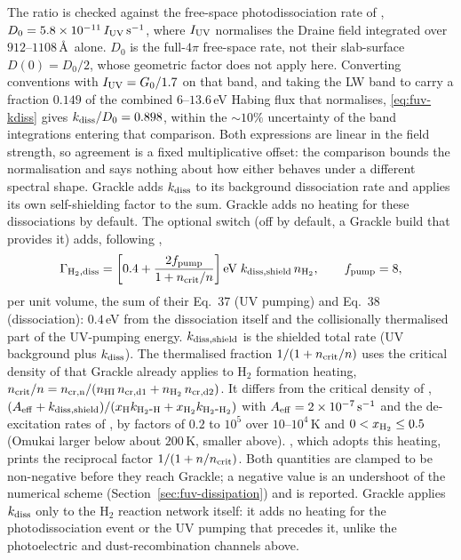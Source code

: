 The ratio is checked against the free-space photodissociation rate of
\citet[their Eq.~5]{Sternberg2014},
$D_0 = 5.8\times10^{-11}\,I_{\rm UV}\,{\rm s^{-1}}$, where $I_{\rm UV}$
normalises the Draine field integrated over $912$--$1108$\,\AA\ alone.
$D_0$ is the full-$4\pi$ free-space rate, not their slab-surface
$D(0) = D_0/2$, whose geometric factor does not apply here. Converting
conventions with $I_{\rm UV} = G_0/1.7$ on that band, and taking the LW
band to carry a fraction $0.149$ of the combined $6$--$13.6$\,eV Habing
flux that  normalises,
\eqref{eq:fuv-kdiss} gives $k_{\rm diss}/D_0 = 0.898$, within the $\sim
10\%$ uncertainty of the band integrations entering that comparison. Both
expressions are linear in the field strength, so agreement is a fixed
multiplicative offset: the comparison bounds the normalisation and says
nothing about how either behaves under a different spectral shape. Grackle adds
$k_{\rm diss}$ to its background dissociation rate and applies its own
self-shielding factor \citep{WolcottGreenHaiman2019} to the sum. Grackle
adds no heating for these dissociations by default. The optional switch
 (off by default,
a Grackle build that provides it) adds, following
\citet[their Eqs.~37--38]{Kim2023},
\begin{equation}
  \Gamma_{\rm H_2,diss} = \left[0.4 + \frac{2 f_{\rm pump}}
    {1 + n_{\rm crit}/n}\right]{\rm eV}\;k_{\rm diss,shield}\,n_{\rm H_2},
  \qquad f_{\rm pump} = 8 ,
  \label{eq:fuv-h2-diss-heating}
\end{equation}
per unit volume, the sum of their Eq.~37 (UV pumping) and Eq.~38
(dissociation): $0.4$\,eV from the dissociation itself and the
collisionally thermalised part of the UV-pumping energy.
$k_{\rm diss,shield}$ is the shielded total rate (UV background plus
$k_{\rm diss}$). The thermalised fraction $1/(1 + n_{\rm crit}/n)$ uses
the critical density of \citet[their Eq.~23]{Omukai2000} that Grackle
already applies to H$_2$ formation heating,
$n_{\rm crit}/n = n_{\rm cr,n}/(n_{\rm HI}\,n_{\rm cr,d1} + n_{\rm H_2}\,n_{\rm cr,d2})$.
It differs from the critical density of \citet[their Eq.~39]{Kim2023},
$(A_{\rm eff} + k_{\rm diss,shield})/(x_{\rm H}k_{\rm H_2\mbox{-}H} + x_{\rm H_2}k_{\rm H_2\mbox{-}H_2})$
with $A_{\rm eff} = 2\times10^{-7}\,{\rm s^{-1}}$ \citep{Burton1990} and
the de-excitation rates of \citet[their Eq.~A.1]{Visser2018}, by factors
of $0.2$ to $10^5$ over $10$--$10^4$\,K and $0 < x_{\rm H_2} \le 0.5$
(Omukai larger below about $200$\,K, smaller above).
\citet[their Appendix~A]{Smith2026}, which adopts this heating, prints
the reciprocal factor $1/(1 + n/n_{\rm crit})$. Both quantities are clamped to be
non-negative before they reach Grackle; a negative value is an
undershoot of the numerical scheme (Section~\ref{sec:fuv-dissipation})
and is reported. Grackle applies $k_{\rm diss}$ only to the H$_2$
reaction network itself: it adds no heating for the photodissociation
event or the UV pumping that precedes it, unlike the photoelectric and
dust-recombination channels above.

